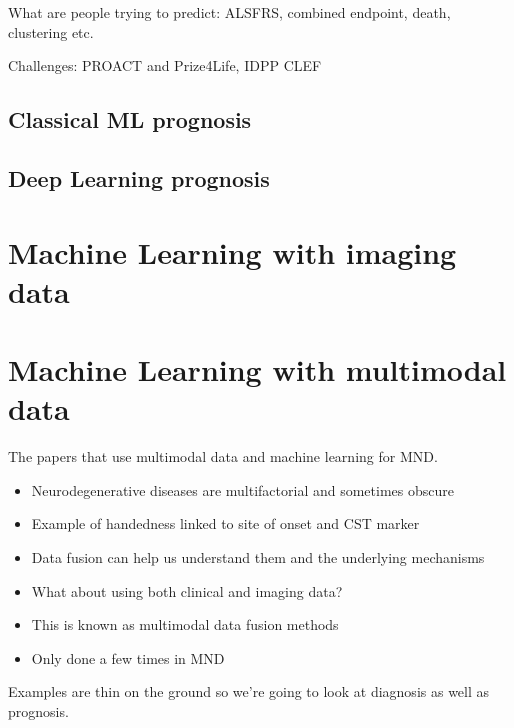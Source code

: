 What are people trying to predict: ALSFRS, combined endpoint, death, clustering etc.

Challenges: PROACT and Prize4Life, IDPP CLEF

\subsection{Classical ML prognosis}

\subsection{Deep Learning prognosis}

\section{Machine Learning with imaging data}


\section{Machine Learning with multimodal data}

The papers that use multimodal data and machine learning for MND.
\begin{itemize}
    \item Neurodegenerative diseases are multifactorial and sometimes obscure
    \item Example of handedness linked to site of onset and CST marker
    \item Data fusion can help us understand them and the underlying mechanisms
    \item What about using both clinical and imaging data?
    \item This is known as multimodal data fusion methods
    \item Only done a few times in MND
\end{itemize}

Examples are thin on the ground so we're going to look at diagnosis as well as prognosis.



